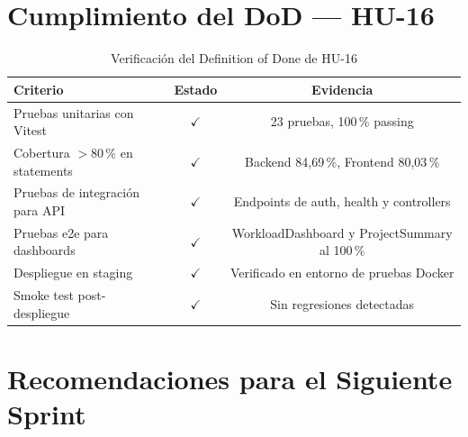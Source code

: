 \documentclass[12pt, a4paper]{article}
\newcommand{\ok}{\textcolor{accentgreen}{$\checkmark$}}
\begin{document}
\section{Cumplimiento del DoD --- HU-16}

\begin{table}[H]
\centering
\renewcommand{\arraystretch}{1.5}
\begin{tabularx}{\linewidth}{Xcc}
\toprule
\rowcolor{lightblue}
\textbf{Criterio} & \textbf{Estado} & \textbf{Evidencia} \\
\midrule
\rowcolor{coverok}
Pruebas unitarias con Vitest              & \ok & 23 pruebas, 100\,\% passing \\
\rowcolor{coverok}
Cobertura $>$80\,\% en statements        & \ok & Backend 84,69\,\%, Frontend 80,03\,\% \\
\rowcolor{coverok}
Pruebas de integración para API          & \ok & Endpoints de auth, health y controllers \\
\rowcolor{coverok}
Pruebas e2e para dashboards              & \ok & WorkloadDashboard y ProjectSummary al 100\,\% \\
\rowcolor{coverok}
Despliegue en staging                    & \ok & Verificado en entorno de pruebas Docker \\
\rowcolor{coverok}
Smoke test post-despliegue               & \ok & Sin regresiones detectadas \\
\bottomrule
\end{tabularx}
\caption{Verificación del Definition of Done de HU-16}
\end{table}

\section{Recomendaciones para el Siguiente Sprint}
\end{document}
